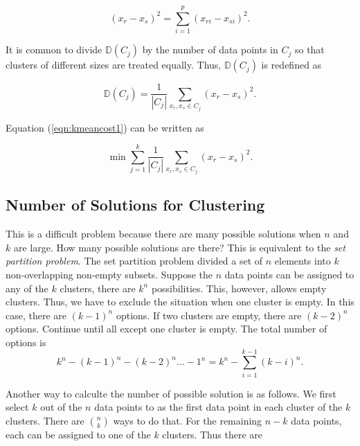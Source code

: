 \begin{equation}
(x_r - x_s)^ 2 = \underset{i = 1}{\overset{p}{\sum}} (x_{ri} - x_{si})^2.
\end{equation}

It is common to divide $\mathds{D}(C_j)$ by the number of data points
in $C_j$ so that clusters of different sizes
are treated equally. Thus, $\mathds{D}(C_j)$ is redefined as

\begin{equation}
\mathds{D}(C_j) = \frac{1}{|C_j|} \underset{x_r, x_s \in C_j}{\sum} (x_r - x_s)^ 2.
\end{equation}

Equation (\ref{eqn:kmeancost1}) can be written as

\begin{equation}
\min \underset{j = 1}{\overset{k}{\sum}}  \frac{1}{|C_j|} \underset{x_r, x_s \in C_j}{\sum} (x_r - x_s)^ 2.
\end{equation}


\subsection{Number of Solutions for Clustering}

This is a difficult problem because there are many possible solutions
when $n$ and $k$ are large. How many possible solutions are there?
This is equivalent to the {\it set partition problem}.  The set
partition problem divided a set of $n$ elements into $k$
non-overlapping non-empty subsets.    Suppose the
$n$ data points can be assigned to any of the $k$ clusters, there are
$k^n$ possibilities.  This, however, allows empty clusters.
Thus, we have to exclude the situation when one 
cluster is empty. In this case, there are $(k-1)^n$ options.
If two clusters are empty, there are $(k-2)^n$ options.
Continue until all except one cluster is empty. The total number of
options is
\begin{equation}
k^n - (k-1)^n - (k -2) ^ n ... - 1^n = k^n - \underset{i = 1}{\overset{k-1} \sum} (k-i)^n.
\end{equation}  

Another way to calculte the number of possible solution is as follows.
We first select $k$ out of the $n$ data points to as the first data
point in each cluster of the $k$ clusters. There are $\binom{n}{k}$
ways to do that.  For the remaining $n-k$ data points, each can be
assigned to one of the $k$ clusters. Thus there are

